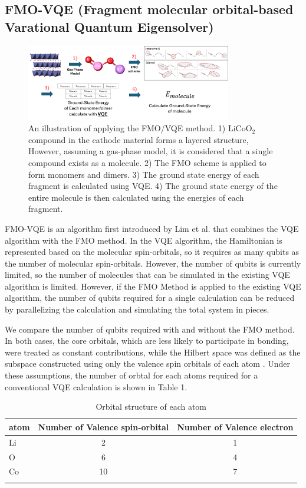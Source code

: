 \documentclass[pdflatex,sn-mathphys-num]{sn-jnl}%
\theoremstyle{thmstyleone}%
\theoremstyle{thmstyletwo}%
\theoremstyle{thmstylethree}%
\begin{document}
\subsection{FMO-VQE (Fragment molecular orbital-based Varational Quantum Eigensolver)}\label{subsec2.4}
\begin{figure}[H]
\centering
\includegraphics[width=0.8\textwidth]{fig/FMO_VQE_schme1.png}
\caption{An illustration of applying the FMO/VQE method. 1) \(\mathrm{LiCoO_2}\) compound in the cathode material forms a layered structure, However, assuming a gas-phase model, it is considered that a single compound exists as a molecule. 2) The FMO scheme is applied to form monomers and dimers. 3) The ground state energy of each fragment is calculated using VQE. 4) The ground state energy of the entire molecule is then calculated using the energies of each fragment.}\label{Fig.5}
\end{figure}

FMO-VQE is an algorithm first introduced by Lim et al. that combines the VQE algorithm with the FMO method. In the VQE algorithm, the Hamiltonian is represented based on the molecular spin-orbitals, so it requires as many qubits as the number of molecular spin-orbitals. However, the number of qubits is currently limited, so the number of molecules that can be simulated in the existing VQE algorithm is limited. However, if the FMO Method is applied to the existing VQE algorithm, the number of qubits required for a single calculation can be reduced by parallelizing the calculation and simulating the total system in pieces. 

We compare the number of qubits required with and without the FMO method. In both cases, the core orbitals, which are less likely to participate in bonding, were treated as constant contributions, while the Hilbert space was defined as the subspace constructed using only the valence spin orbitals of each atom \cite{AS1,AS2}. Under these assumptions, the number of orbtal for each atoms required for a conventional VQE calculation is shown in Table 1.

\begin{table}[h]
\caption{Orbital structure of each atom}\label{tab1}%
\begin{tabular}{@{}lcc@{}}
\toprule
atom & Number of Valence spin-orbital  & Number of Valence electron\\
\midrule
\(\mathrm{Li}\)   & 2   & 1   \\ 
\(\mathrm{O}\)   & 6   & 4  \\
\(\mathrm{Co}\)   & 10   & 7   \\
\botrule
\end{tabular}
\end{table}
\end{document}
